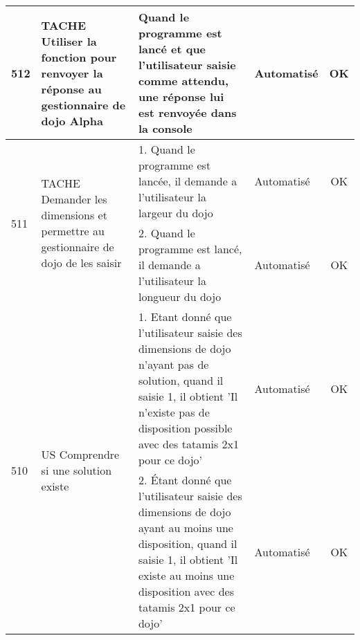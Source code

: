 \begin{adjustwidth}{-1.5cm}{0cm}
{\begin{tabular}{|m{0.6cm}|m{5.5cm}|m{8cm}|m{2cm}|c|}
            512                      & TACHE Utiliser la fonction pour renvoyer la réponse au gestionnaire de dojo	Alpha                                                              & Quand le programme est lancé et que l'utilisateur saisie comme attendu, une réponse lui est renvoyée dans la console                                                                                                       & Automatisé      & OK       \\ \hline
            \multirow{2}{0.6cm}{511} & \multirow{2}{5.5cm}{TACHE Demander les dimensions et permettre au gestionnaire de dojo de les saisir}                                         & 1. Quand le programme est lancée, il demande a l'utilisateur la largeur du dojo                                                                                                                                            & Automatisé      & OK       \\ \cline{3-5}
                                     &                                                                                                                                               & 2. Quand le programme est lancé, il demande a l'utilisateur la longueur du dojo                                                                                                                                            & Automatisé      & OK       \\ \hline
            \multirow{2}{0.6cm}{510} & \multirow{2}{5.5cm}{US Comprendre si une solution existe}                                                                                     & \cellcolor{tsgrey} 1. Etant donné que l'utilisateur saisie des dimensions de dojo n'ayant pas de solution, quand il saisie 1, il obtient 'Il n'existe pas de disposition possible avec des tatamis 2x1 pour ce dojo'     & Automatisé      & OK       \\ \cline{3-5}
                                     &                                                                                                                                               & \cellcolor{tsgrey} 2. Étant donné que l'utilisateur saisie des dimensions de dojo ayant au moins une disposition, quand il saisie 1, il obtient 'Il existe au moins une disposition avec des tatamis 2x1 pour ce dojo'   & Automatisé      & OK       \\ \hline
        \end{tabular}}
\end{adjustwidth}



